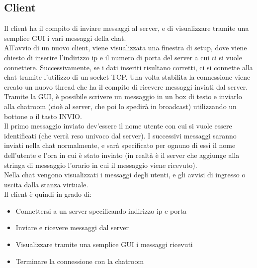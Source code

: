 \documentclass{article}
\begin{document}
\subsection{Client}
Il client ha il compito di inviare messaggi al server, e di visualizzare tramite una semplice GUI i vari messaggi della chat.\\
All'avvio di un nuovo client, viene visualizzata una finestra di setup, dove viene chiesto di inserire l'indirizzo ip e il numero di porta del server a cui ci si vuole connettere. Successivamente, se i dati inseriti risultano corretti, ci si connette alla chat tramite l'utilizzo di un socket TCP. Una volta stabilita la connessione viene creato un nuovo thread che ha il compito di ricevere messaggi inviati dal server.\\
Tramite la GUI, è possibile scrivere un messaggio in un box di testo e inviarlo alla chatroom (cioè al server, che poi lo spedirà in broadcast) utilizzando un bottone o il tasto INVIO.\\
Il primo messaggio inviato dev'essere il nome utente con cui si vuole essere identificati (che verrà reso univoco dal server). I successivi messaggi saranno inviati nella chat normalmente, e sarà specificato per ognuno di essi il nome dell'utente e l'ora in cui è stato inviato (in realtà è il server che aggiunge alla stringa di messaggio l'orario in cui il messaggio viene ricevuto).\\
Nella chat vengono visualizzati i messaggi degli utenti, e gli avvisi di ingresso o uscita dalla stanza virtuale.\\
\newline
Il client è quindi in grado di:
\begin{itemize}
    \item Connettersi a un server specificando indirizzo ip e porta
    \item Inviare e ricevere messaggi dal server
    \item Visualizzare tramite una semplice GUI i messaggi ricevuti
    \item Terminare la connessione con la chatroom
\end{itemize}
\end{document}

